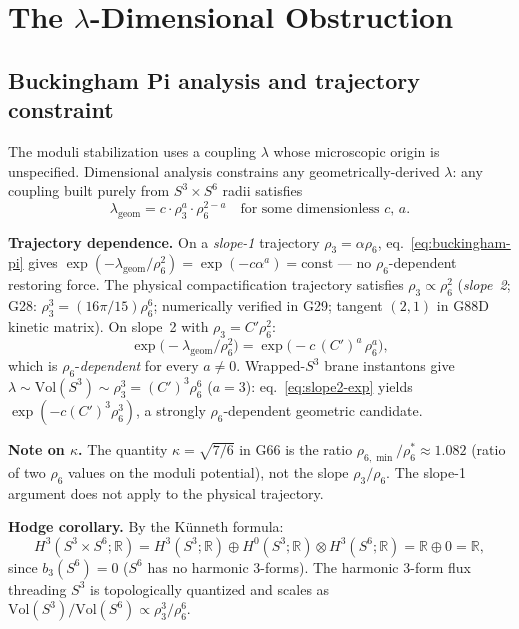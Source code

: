 \documentclass[12pt,a4paper]{article}
\newcommand{\RR}{\mathbb{R}}
\newcommand{\Vol}{\mathrm{Vol}}
\begin{document}
\section{The \texorpdfstring{$\lambda$}{Lambda}-Dimensional Obstruction}
\label{sec:lambda}

\subsection{Buckingham Pi analysis and trajectory constraint}

The moduli stabilization uses a coupling $\lambda$ whose microscopic origin is unspecified.
Dimensional analysis constrains any geometrically-derived $\lambda$: any coupling built purely
from $S^3\times S^6$ radii satisfies
\begin{equation}
  \lambda_{\mathrm{geom}} = c\cdot\rho_3^a\cdot\rho_6^{2-a}
  \quad\text{for some dimensionless }c,\,a.
  \label{eq:buckingham-pi}
\end{equation}

\textbf{Trajectory dependence.}
On a \emph{slope-1} trajectory $\rho_3=\alpha\rho_6$,
eq.~\eqref{eq:buckingham-pi} gives $\exp(-\lambda_{\mathrm{geom}}/\rho_6^2)=\exp(-c\alpha^a)=\mathrm{const}$
--- no $\rho_6$-dependent restoring force.
The physical compactification trajectory satisfies $\rho_3\propto\rho_6^2$
(\emph{slope~2}; G28: $\rho_3^3=(16\pi/15)\rho_6^6$; numerically verified in G29; tangent
$(2,1)$ in G88D kinetic matrix). On slope~2 with $\rho_3=C'\rho_6^2$:
\begin{equation}
  \exp\!\bigl(-\lambda_{\mathrm{geom}}/\rho_6^2\bigr)
  = \exp\!\bigl(-c\,(C')^a\,\rho_6^{a}\bigr),
  \label{eq:slope2-exp}
\end{equation}
which is $\rho_6$-\emph{dependent} for every $a\neq 0$.
Wrapped-$S^3$ brane instantons give $\lambda\sim\Vol(S^3)\sim\rho_3^3=(C')^3\rho_6^6$
($a=3$): eq.~\eqref{eq:slope2-exp} yields $\exp(-c(C')^3\rho_6^3)$, a strongly
$\rho_6$-dependent geometric candidate.

\textbf{Note on $\kappa$.}
The quantity $\kappa=\sqrt{7/6}$ in G66 is the ratio $\rho_{6,\min}/\rho_6^*\approx 1.082$
(ratio of two $\rho_6$ values on the moduli potential), not the slope $\rho_3/\rho_6$.
The slope-1 argument does not apply to the physical trajectory.

\textbf{Hodge corollary.} By the K\"unneth formula:
\begin{equation}
  H^3(S^3\times S^6;\RR) = H^3(S^3;\RR)\oplus H^0(S^3;\RR)\otimes H^3(S^6;\RR) = \RR\oplus 0 = \RR,
\end{equation}
since $b_3(S^6)=0$ ($S^6$ has no harmonic 3-forms). The harmonic 3-form flux threading $S^3$
is topologically quantized and scales as $\Vol(S^3)/\Vol(S^6)\propto\rho_3^3/\rho_6^6$.
\end{document}
